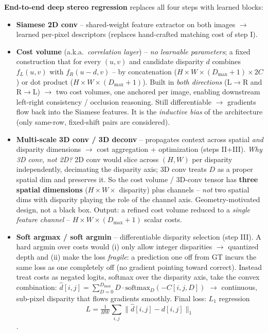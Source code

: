 \documentclass{article}
\begin{document}
\textbf{End-to-end deep stereo regression} replaces all four steps with learned blocks:
\begin{itemize}
    \item \textbf{Siamese 2D conv} -- shared-weight feature extractor on both images $\rightarrow$ learned per-pixel descriptors (replaces hand-crafted matching cost of step I).
    \item \textbf{Cost volume} (a.k.a.\ \textit{correlation layer}) -- \textit{no learnable parameters}; a fixed construction that for every $(u,v)$ and candidate disparity $d$ combines $f_L(u,v)$ with $f_R(u-d, v)$ -- by concatenation ($H\times W\times (D_{\max}+1)\times 2C$) or dot product ($H\times W\times (D_{\max}+1)$). Built in \textit{both directions} (L$\rightarrow$R and R$\rightarrow$L) $\rightarrow$ two cost volumes, one anchored per image, enabling downstream left-right consistency / occlusion reasoning. Still differentiable $\rightarrow$ gradients flow back into the Siamese features. It is the \textit{inductive bias} of the architecture (only same-row, fixed-shift pairs are considered).
    \item \textbf{Multi-scale 3D conv / 3D deconv} -- propagates context across spatial \textit{and} disparity dimensions $\rightarrow$ cost aggregation + optimization (steps II+III). \textit{Why 3D conv, not 2D?} 2D conv would slice across $(H,W)$ per disparity independently, decimating the disparity axis; 3D conv treats $D$ as a proper spatial dim and preserves it. So the cost volume / 3D-conv tensor has \textbf{three spatial dimensions} ($H\times W\times$ disparity) plus channels -- \textit{not} two spatial dims with disparity playing the role of the channel axis. Geometry-motivated design, not a black box. Output: a refined cost volume reduced to a \textit{single feature channel} -- $H\times W\times (D_{\max}+1)$ scalar costs.
    \item \textbf{Soft argmax / soft argmin} -- differentiable disparity selection (step III). A hard argmin over costs would (i) only allow integer disparities $\rightarrow$ quantized depth and (ii) make the loss \textit{fragile}: a prediction one off from GT incurs the same loss as one completely off (no gradient pointing toward correct). Instead treat costs as negated logits, softmax over the disparity axis, take the convex combination:
    $\hat d[i,j] = \sum_{D=0}^{D_{\max}} D \cdot \mathrm{softmax}_D(-C[i,j,D])$
    $\rightarrow$ continuous, sub-pixel disparity that flows gradients smoothly. Final loss: $L_1$ regression 
    $$L = \tfrac{1}{HW}\sum_{i,j} \lVert \hat d[i,j] - d[i,j] \rVert_1$$.
\end{itemize}
\end{document}
